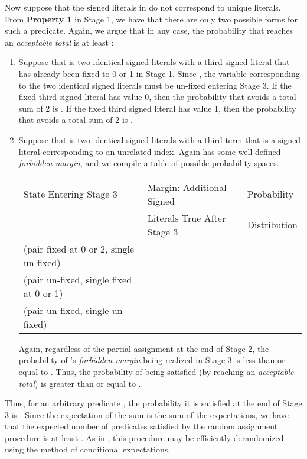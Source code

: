 \documentclass{article}
\begin{document}
Now suppose that the signed literals in  do not correspond to unique literals. From \textbf{Property 1} in Stage 1, we have that there are only two possible forms for such a predicate. Again, we argue that in any case, the probability that  reaches an \textit{acceptable total} is at least :
\begin{enumerate}
\item Suppose that  is two identical signed literals with a third signed literal that has already been fixed to 0 or 1 in Stage 1. Since , the variable corresponding to the two identical signed literals must be un-fixed entering Stage 3. If the fixed third signed literal has value 0, then the probability that  avoids a total sum of 2 is . If the fixed third signed literal has value 1, then the probability that  avoids a total sum of 2 is .


\item Suppose that  is two identical signed literals with a third term that is a signed literal corresponding to an unrelated index. Again  has some well defined \textit{forbidden margin}, and we compile a table of possible probability spaces.


\begin{tabular}{|l|l|l|} \hline
State Entering Stage 3 & Margin: Additional Signed  & Probability  \\
 & Literals True After Stage 3& Distribution  \\
\hline
(pair fixed at 0 or 2, single un-fixed)& &\\  
\hline
(pair un-fixed, single fixed at 0 or 1) & & \\ 
\hline
(pair un-fixed, single un-fixed) & & \\ 
\hline
\end{tabular}

Again, regardless of the partial assignment at the end of Stage 2, the probability of 's \textit{forbidden margin} being realized in Stage 3 is less than or equal to . Thus, the probability of  being satisfied (by reaching an \textit{acceptable total}) is greater than or equal to .
\end{enumerate}

Thus, for an arbitrary predicate , the probability it is satisfied at the end of Stage 3 is . Since the expectation of the sum is the sum of the expectations, we have that the expected number of predicates satisfied by the random assignment procedure is at least . As in \citep{RS}, this procedure may be efficiently derandomized using the method of conditional expectations.
\end{document}
